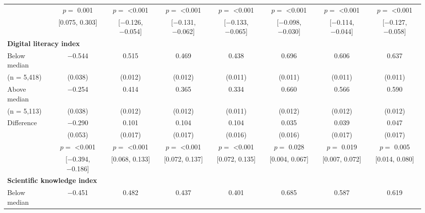 \begin{tabular}[t]{lccccccc}
 & $p =$ \num{0.001} & $p =$ \num{<0.001} & $p =$ \num{<0.001} & $p =$ \num{<0.001} & $p =$ \num{<0.001} & $p =$ \num{<0.001} & $p =$ \num{<0.001}\\
 & {}[\num{0.075}, \num{0.303}] & {}[\num{-0.126}, \num{-0.054}] & {}[\num{-0.131}, \num{-0.062}] & {}[\num{-0.133}, \num{-0.065}] & {}[\num{-0.098}, \num{-0.030}] & {}[\num{-0.114}, \num{-0.044}] & {}[\num{-0.127}, \num{-0.058}]\\\multicolumn{4}{l}{\textbf{Digital literacy index}} \rule{0pt}{1.2\normalbaselineskip}\\
\hspace{1em} Below median & \num{-0.544} & \num{0.515} & \num{0.469} & \num{0.438} & \num{0.696} & \num{0.606} & \num{0.637}\\
\hspace{2em}(n = 5,418) & (\num{0.038}) & (\num{0.012}) & (\num{0.012}) & (\num{0.011}) & (\num{0.011}) & (\num{0.011}) & (\num{0.011})\\
\hspace{1em} Above median & \num{-0.254} & \num{0.414} & \num{0.365} & \num{0.334} & \num{0.660} & \num{0.566} & \num{0.590}\\
\hspace{2em}(n = 5,113) & (\num{0.038}) & (\num{0.012}) & (\num{0.012}) & (\num{0.011}) & (\num{0.012}) & (\num{0.012}) & (\num{0.012})\\\cmidrule(lr){2-8}
\hspace{1em}  Difference & \num{-0.290} & \num{0.101} & \num{0.104} & \num{0.104} & \num{0.035} & \num{0.039} & \num{0.047}\\
\hspace{2em} & (\num{0.053}) & (\num{0.017}) & (\num{0.017}) & (\num{0.016}) & (\num{0.016}) & (\num{0.017}) & (\num{0.017})\\
 & $p =$ \num{<0.001} & $p =$ \num{<0.001} & $p =$ \num{<0.001} & $p =$ \num{<0.001} & $p =$ \num{0.028} & $p =$ \num{0.019} & $p =$ \num{0.005}\\
 & {}[\num{-0.394}, \num{-0.186}] & {}[\num{0.068}, \num{0.133}] & {}[\num{0.072}, \num{0.137}] & {}[\num{0.072}, \num{0.135}] & {}[\num{0.004}, \num{0.067}] & {}[\num{0.007}, \num{0.072}] & {}[\num{0.014}, \num{0.080}]\\\multicolumn{4}{l}{\textbf{Scientific knowledge index}} \rule{0pt}{1.2\normalbaselineskip}\\
\hspace{1em} Below median & \num{-0.451} & \num{0.482} & \num{0.437} & \num{0.401} & \num{0.685} & \num{0.587} & \num{0.619}\\

\end{tabular}
